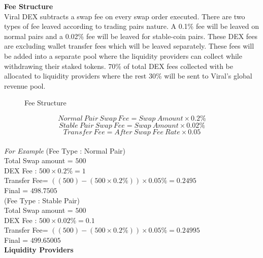 \documentclass[10pt]{article}
\begin{document}
\textbf{Fee Structure}\\

Viral DEX subtracts a swap fee on every swap order executed. There are two types of fee leaved according to trading pairs nature. A 0.1\% fee will be leaved on normal pairs and a 0.02\% fee will be leaved for stable-coin pairs. These DEX fees are excluding wallet transfer fees which will be leaved separately. These fees will be added into a separate pool where the liquidity providers can collect while withdrawing their staked tokens. 70\% of total DEX fees collected with be allocated to liquidity providers where the rest 30\% will be sent to Viral's global revenue pool.\\

\begin{figure}[H]
\begin{center}
\caption{Fee Structure}
\end{center}
\end{figure}



\begin{equation}
Normal\:Pair\:Swap\:Fee=Swap\:Amount \times  0.2\%
\end{equation}
\begin{equation}
Stable\:Pair\:Swap\:Fee=Swap\:Amount \times  0.02\%
\end{equation}
\begin{equation}
Transfer\:Fee=After\:Swap\:Fee\:Rate \times  0.05%
\end{equation}\\

\textit{For Example} 
(Fee Type : Normal Pair) \\
Total Swap amount = $500$\\
DEX Fee : $500 \times  0.2\% = 1$ \\
Transfer Fee= $((500)-(500 \times  0.2\%)) \times  0.05\% = 0.2495$ \\
Final = $498.7505$\\

(Fee Type : Stable Pair) \\
Total Swap amount = $500$\\
DEX Fee : $500 \times  0.02\% = 0.1$ \\
Transfer Fee= $((500)-(500 \times  0.2\%)) \times  0.05\% = 0.24995$ \\
Final = $499.65005$\\
 
 
\textbf{Liquidity Providers}\\
\end{document}
